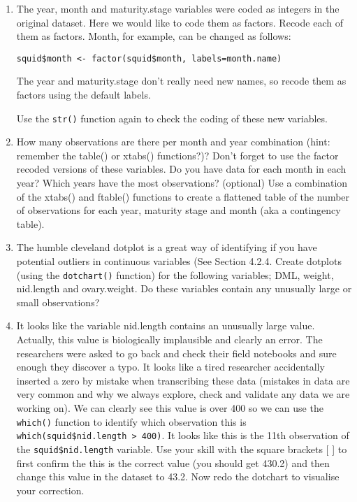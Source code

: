 \documentclass[12pt]{article}
\newcommand{\lst}[1]{\lstinline{#1}}
\begin{document}
\begin{enumerate}
\item
The  year, month and maturity.stage variables were coded as integers in the original dataset. Here we would like to code them as factors. Recode each of them as factors.  Month, for example, can be changed as follows:
\begin{lstlisting}
squid$month <- factor(squid$month, labels=month.name)
\end{lstlisting}

The year and maturity.stage don't really need new names, so recode them as factors
using the default labels.

Use the \lst{str()} function again to check the coding of these new variables.

 
\item How many observations are there per month and year combination (hint: remember the table() or xtabs() functions?)? Don’t forget to use the factor recoded versions of these variables. Do you have data for each month in each year? Which years have the most observations? (optional) Use a combination of the xtabs() and ftable() functions to create a flattened table of the number of observations for each year, maturity stage and month (aka a contingency table).

 
\item The humble cleveland dotplot is a great way of identifying if you have potential outliers in continuous variables (See Section 4.2.4. Create dotplots (using the \lst{dotchart()} function) for the following variables; DML, weight, nid.length and ovary.weight. Do these variables contain any unusually large or small observations?

 
\item It looks like the variable nid.length contains an unusually large value. Actually, this value is biologically implausible and clearly an error. The researchers were asked to go back and check their field notebooks and sure enough they discover a typo. It looks like a tired researcher accidentally inserted a zero by mistake when transcribing these data (mistakes in data are very common and why we always explore, check and validate any data we are working on). We can clearly see this value is over 400 so we can use the \lst{which()} function to identify which observation this is \lst{which(squid$nid.length > 400)}.
 It looks like this is the 11th observation of the \lst{squid$nid.length} variable. Use your skill with the square brackets [ ] to first confirm the this is the correct value (you should get 430.2) and then change this value in the dataset to 43.2. Now redo the dotchart to visualise your correction.
 

\end{enumerate}
\end{document}
